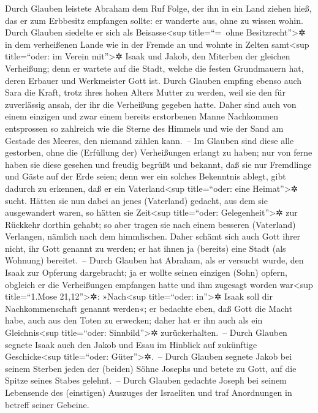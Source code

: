 Durch Glauben leistete Abraham dem Ruf Folge, der ihn in
ein Land ziehen hieß, das er zum Erbbesitz empfangen sollte: er wanderte
aus, ohne zu wissen wohin.  Durch Glauben siedelte er sich
als Beisasse\textless sup title=``=~ohne Besitzrecht''\textgreater✲ in
dem verheißenen Lande wie in der Fremde an und wohnte in Zelten
samt\textless sup title=``oder: im Verein mit''\textgreater✲ Isaak und
Jakob, den Miterben der gleichen Verheißung;  denn er
wartete auf die Stadt, welche die festen Grundmauern hat, deren Erbauer
und Werkmeister Gott ist.  Durch Glauben empfing ebenso
auch Sara die Kraft, trotz ihres hohen Alters Mutter zu werden, weil sie
den für zuverlässig ansah, der ihr die Verheißung gegeben hatte.
 Daher sind auch von einem einzigen und zwar einem
bereits erstorbenen Manne Nachkommen entsprossen so zahlreich wie die
Sterne des Himmels und wie der Sand am Gestade des Meeres, den niemand
zählen kann.~--  Im Glauben sind diese alle gestorben,
ohne die (Erfüllung der) Verheißungen erlangt zu haben; nur von ferne
haben sie diese gesehen und freudig begrüßt und bekannt, daß sie nur
Fremdlinge und Gäste auf der Erde seien;  denn wer ein
solches Bekenntnis ablegt, gibt dadurch zu erkennen, daß er ein
Vaterland\textless sup title=``oder: eine Heimat''\textgreater✲ sucht.
 Hätten sie nun dabei an jenes (Vaterland) gedacht, aus
dem sie ausgewandert waren, so hätten sie Zeit\textless sup
title=``oder: Gelegenheit''\textgreater✲ zur Rückkehr dorthin gehabt;
 so aber tragen sie nach einem besseren (Vaterland)
Verlangen, nämlich nach dem himmlischen. Daher schämt sich auch Gott
ihrer nicht, ihr Gott genannt zu werden; er hat ihnen ja (bereits) eine
Stadt (als Wohnung) bereitet.~--  Durch Glauben hat
Abraham, als er versucht wurde, den Isaak zur Opferung dargebracht; ja
er wollte seinen einzigen (Sohn) opfern, obgleich er die Verheißungen
empfangen hatte  und ihm zugesagt worden war\textless sup
title=``1.Mose 21,12''\textgreater✲: »Nach\textless sup title=``oder:
in''\textgreater✲ Isaak soll dir Nachkommenschaft genannt werden«;
 er bedachte eben, daß Gott die Macht habe, auch aus den
Toten zu erwecken; daher hat er ihn auch als ein Gleichnis\textless sup
title=``oder: Sinnbild''\textgreater✲ zurückerhalten.~-- 
Durch Glauben segnete Isaak auch den Jakob und Esau im Hinblick auf
zukünftige Geschicke\textless sup title=``oder: Güter''\textgreater✲.~--
 Durch Glauben segnete Jakob bei seinem Sterben jeden der
(beiden) Söhne Josephs und betete zu Gott, auf die Spitze seines Stabes
gelehnt.~--  Durch Glauben gedachte Joseph bei seinem
Lebensende des (einstigen) Auszuges der Israeliten und traf Anordnungen
in betreff seiner Gebeine.

